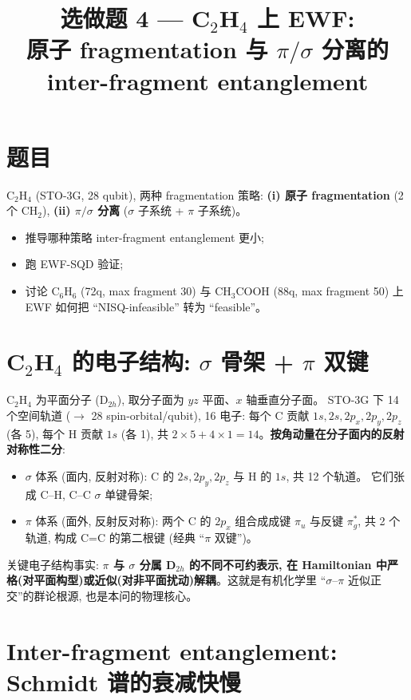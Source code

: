 \documentclass[11pt]{article}
\title{\textbf{选做题 4 --- C$_2$H$_4$ 上 EWF:\\
原子 fragmentation 与 $\pi/\sigma$ 分离的 inter-fragment entanglement}}
\date{}
\newcommand{\sig}{\sigma}
\begin{document}
\maketitle

\section*{题目}
C$_2$H$_4$ (STO-3G, 28 qubit), 两种 fragmentation 策略:
\textbf{(i) 原子 fragmentation} (2 个 CH$_2$),
\textbf{(ii) $\pi/\sigma$ 分离} ($\sig$ 子系统 + $\pi$ 子系统)。
\begin{itemize}
  \item[(a)] 推导哪种策略 inter-fragment entanglement 更小;
  \item[(b)] 跑 EWF-SQD 验证;
  \item[(c)] 讨论 C$_6$H$_6$ (72q, max fragment 30) 与 CH$_3$COOH
        (88q, max fragment 50) 上 EWF 如何把 ``NISQ-infeasible'' 转为 ``feasible''。
\end{itemize}

\section{C$_2$H$_4$ 的电子结构: $\sig$ 骨架 + $\pi$ 双键}
C$_2$H$_4$ 为平面分子 (D$_{2h}$), 取分子面为 $yz$ 平面、$x$ 轴垂直分子面。
STO-3G 下 14 个空间轨道 ($\to$ 28 spin-orbital/qubit), 16 电子:
每个 C 贡献 $1s,2s,2p_x,2p_y,2p_z$ (各 5), 每个 H 贡献 $1s$ (各 1), 共
$2\times5+4\times1=14$。\textbf{按角动量在分子面内的反射对称性二分}:
\begin{itemize}
  \item $\sig$ 体系 (面内, 反射对称): C 的 $2s,2p_y,2p_z$ 与 H 的 $1s$, 共 12 个轨道。
        它们张成 C--H, C--C $\sig$ 单键骨架;
  \item $\pi$ 体系 (面外, 反射反对称): 两个 C 的 $2p_x$ 组合成成键 $\pi_u$ 与反键
        $\pi_g^*$, 共 2 个轨道, 构成 C=C 的第二根键 (经典 ``$\pi$ 双键'')。
\end{itemize}
关键电子结构事实: \textbf{$\pi$ 与 $\sig$ 分属 D$_{2h}$ 的不同不可约表示, 在
Hamiltonian 中严格(对平面构型)或近似(对非平面扰动)解耦}。这就是有机化学里
``$\sig$--$\pi$ 近似正交''的群论根源, 也是本问的物理核心。

\section{Inter-fragment entanglement: Schmidt 谱的衰减快慢}
\end{document}
